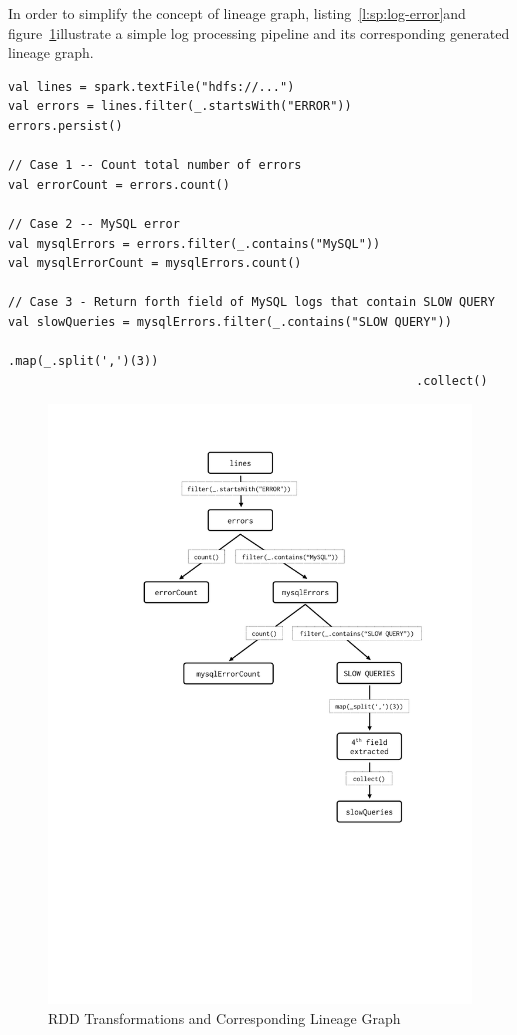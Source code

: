In order to simplify the concept of lineage graph, listing~\ref{l:sp:log-error}\footnotemark and figure~\ref{fig:spark-lineage-sample}\footnotemark[\value{footnote}] illustrate a simple log processing pipeline and its corresponding generated lineage graph.
\begin{lstlisting}[float=h, caption={Parsing Errors in Log Files From HDFS},label={l:sp:log-error},captionpos=b,morekeywords={val}]
val lines = spark.textFile("hdfs://...")
val errors = lines.filter(_.startsWith("ERROR"))
errors.persist()

// Case 1 -- Count total number of errors
val errorCount = errors.count()

// Case 2 -- MySQL error
val mysqlErrors = errors.filter(_.contains("MySQL"))
val mysqlErrorCount = mysqlErrors.count()

// Case 3 - Return forth field of MySQL logs that contain SLOW QUERY
val slowQueries = mysqlErrors.filter(_.contains("SLOW QUERY"))
                                                         .map(_.split(',')(3))
                                                         .collect()
\end{lstlisting}
\begin{figure}[p]
    \centering
    \includegraphics[clip,trim=4.5cm 8.9cm 2.2cm 2.2cm]{spark-lineage-sample.pdf}
    \caption{RDD Transformations and Corresponding Lineage Graph}
    \label{fig:spark-lineage-sample}
\end{figure}

